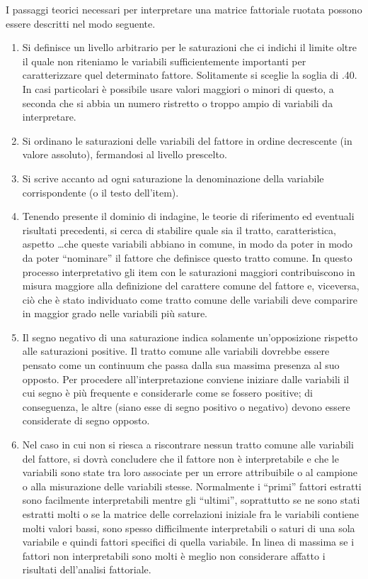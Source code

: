 \documentclass[
  11pt,
]{krantz}
\begin{document}
I passaggi teorici necessari per interpretare una matrice fattoriale ruotata possono essere descritti nel modo seguente.

\begin{enumerate}
\def\labelenumi{\arabic{enumi}.}
\item
  Si definisce un livello arbitrario per le saturazioni che ci indichi il limite oltre il quale non riteniamo le variabili sufficientemente importanti per caratterizzare quel determinato fattore. Solitamente si sceglie la soglia di .40. In casi particolari è possibile usare valori maggiori o minori di questo, a seconda che si abbia un numero ristretto o troppo ampio di variabili da interpretare.
\item
  Si ordinano le saturazioni delle variabili del fattore in ordine decrescente (in valore assoluto), fermandosi al livello prescelto.
\item
  Si scrive accanto ad ogni saturazione la denominazione della variabile corrispondente (o il testo dell'item).
\item
  Tenendo presente il dominio di indagine, le teorie di riferimento ed eventuali risultati precedenti, si cerca di stabilire quale sia il tratto, caratteristica, aspetto \ldots che queste variabili abbiano in comune, in modo da poter in modo da poter ``nominare'' il fattore che definisce questo tratto comune. In questo processo interpretativo gli item con le saturazioni maggiori contribuiscono in misura maggiore alla definizione del carattere comune del fattore e, viceversa, ciò che è stato individuato come tratto comune delle variabili deve comparire in maggior grado nelle variabili più sature.
\item
  Il segno negativo di una saturazione indica solamente un'opposizione rispetto alle saturazioni positive. Il tratto comune alle variabili dovrebbe essere pensato come un continuum che passa dalla sua massima presenza al suo opposto. Per procedere all'interpretazione conviene iniziare dalle variabili il cui segno è più frequente e considerarle come se fossero positive; di conseguenza, le altre (siano esse di segno positivo o negativo) devono essere considerate di segno opposto.
\item
  Nel caso in cui non si riesca a riscontrare nessun tratto comune alle variabili del fattore, si dovrà concludere che il fattore non è interpretabile e che le variabili sono state tra loro associate per un errore attribuibile o al campione o alla misurazione delle variabili stesse. Normalmente i ``primi'' fattori estratti sono facilmente interpretabili mentre gli ``ultimi'', soprattutto se ne sono stati estratti molti o se la matrice delle correlazioni iniziale fra le variabili contiene molti valori bassi, sono spesso difficilmente interpretabili o saturi di una sola variabile e quindi fattori specifici di quella variabile. In linea di massima se i fattori non interpretabili sono molti è meglio non considerare affatto i risultati dell'analisi fattoriale.
\end{enumerate}
\end{document}
